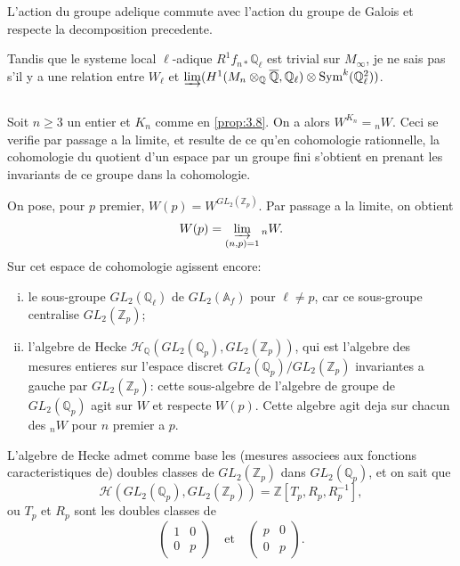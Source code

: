 \documentclass[11pt,reqno]{amsart}
\theoremstyle{plain}
\theoremstyle{remark}
\DeclareMathOperator{\Sym}{Sym}
\newcommand{\Z}{\mathbb{Z}}
\newcommand{\Q}{\mathbb{Q}}
\newcommand{\A}{\mathbb{A}}
\numberwithin{equation}{section}
\begin{document}
L'action du groupe adelique commute avec l'action du groupe de Galois et respecte la decomposition precedente.

Tandis que le systeme local $\ell$-adique $R^1f_{n*}\Q_\ell$ est trivial sur $M_\infty$, je ne sais pas s'il y a une relation entre $W_\ell$ et $\varinjlim (H^1(M_n \otimes_\Q \overline{\Q}, \Q_\ell) \otimes \Sym^k(\Q_\ell^2))$.

\subsection{}\label{subsec:3.12}

Soit $n \geq 3$ un entier et $K_n$ comme en \ref{prop:3.8}. On a alors $W^{K_n} = {}_nW$. Ceci se verifie par passage a la limite, et resulte de ce qu'en cohomologie rationnelle, la cohomologie du quotient d'un espace par un groupe fini s'obtient en prenant les invariants de ce groupe dans la cohomologie.

On pose, pour $p$ premier, $W(p) = W^{GL_2(\Z_p)}$. Par passage a la limite, on obtient
\[
W(p) = \varinjlim_{(n, p) = 1} {}_nW.
\]
Sur cet espace de cohomologie agissent encore:
\begin{enumerate}[(i)]
\item le sous-groupe $GL_2(\Q_\ell)$ de $GL_2(\A_f)$ pour $\ell \neq p$, car ce sous-groupe centralise $GL_2(\Z_p)$;
\item l'algebre de Hecke $\mathcal{H}_\Q(GL_2(\Q_p), GL_2(\Z_p))$, qui est l'algebre des mesures entieres sur l'espace discret $GL_2(\Q_p)/GL_2(\Z_p)$ invariantes a gauche par $GL_2(\Z_p)$: cette sous-algebre de l'algebre de groupe de $GL_2(\Q_p)$ agit sur $W$ et respecte $W(p)$. Cette algebre agit deja sur chacun des ${}_nW$ pour $n$ premier a $p$.
\end{enumerate}

L'algebre de Hecke admet comme base les (mesures associees aux fonctions caracteristiques de) doubles classes de $GL_2(\Z_p)$ dans $GL_2(\Q_p)$, et on sait que
\[
\mathcal{H}(GL_2(\Q_p), GL_2(\Z_p)) = \Z[T_p, R_p, R_p^{-1}],
\]
ou $T_p$ et $R_p$ sont les doubles classes de
\[
\begin{pmatrix} 1 & 0 \\ 0 & p \end{pmatrix} \quad \text{et} \quad \begin{pmatrix} p & 0 \\ 0 & p \end{pmatrix}.
\]

\subsection{}\label{subsec:3.13}
\end{document}
